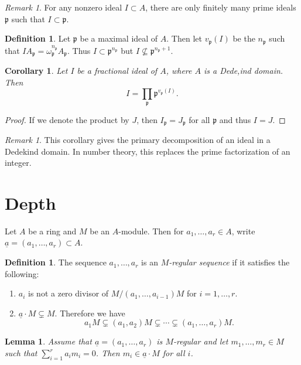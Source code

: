 \documentclass[leqno, openany]{memoir}
\newtheorem{cor}[thm]{Corollary}
\newtheorem{lem}[thm]{Lemma}
\theoremstyle{definition}
\newtheorem{defn}[thm]{Definition}
\theoremstyle{remark}
\newtheorem{rmk}[thm]{Remark}
\theoremstyle{plain}
\theoremstyle{definition}
\theoremstyle{remark}
\newcommand{\mf}[1]{\mathfrak{#1}}
\newcommand{\ul}[1]{\underline{#1}}
\begin{document}
\begin{rmk}
    For any nonzero ideal $I \subset A$, there are only finitely many prime ideals $\mf{p}$ such that $I \subset \mf{p}$.
\end{rmk}

\begin{defn}
    Let $\mf{p}$ be a maximal ideal of $A$. Then let $v_{\mf{p}}(I)$ be the $n_{\mf{p}}$ such that $I A_{\mf{p}} = \omega_{\mf{p}}^{n_{\mf{p}}} A_{\mf{p}}$. Thus $I \subset \mf{p}^{n_{\mf{p}}}$ but $I \not \subseteq \mf{p}^{n_{\mf{p}} + 1}$. 
\end{defn}

\begin{cor}
    Let $I$ be a fractional ideal of $A$, where $A$ is a Dede,ind domain. Then 
    \[ I = \prod_{\mf{p}} \mf{p}^{v_{\mf{p}}(I)}. \]
\end{cor}

\begin{proof}
    If we denote the product by $J$, then $I_{\mf{p}} = J_{\mf{p}}$ for all $\mf{p}$ and thus $I = J$.
\end{proof}

\begin{rmk}
    This corollary gives the primary decomposition of an ideal in a Dedekind domain. In number theory, this replaces the prime factorization of an integer.
\end{rmk}

\section{Depth}%
\label{sec:depth}

Let $A$ be a ring and $M$ be an $A$-module. Then for $a_1, \ldots, a_r \in A$, write $\ul{a} = (a_1, \ldots, a_r) \subset A$. 

\begin{defn}
    The sequence $a_1, \ldots, a_r$ is an \textit{$M$-regular sequence} if it satisfies the following:
    \begin{enumerate}
        \item $a_i$ is not a zero divisor of $M / (a_1, \ldots, a_{i-1})M$ for $i = 1, \ldots, r$.
        \item $\ul{a} \cdot M \subsetneq M$. Therefore we have
            \[ a_1 M \subsetneq (a_1,a_2) M \subsetneq \cdots \subsetneq (a_1, \ldots, a_r) M. \]
    \end{enumerate}
\end{defn}

\begin{lem}
    Assume that $\ul{a} = (a_1, \ldots, a_r)$ is $M$-regular and let $m_1, \ldots, m_r \in M$ such that $\sum_{i=1}^r a_i m_i = 0$. Then $m_i \in \ul{a} \cdot M$ for all $i$.
\end{lem}
\end{document}
